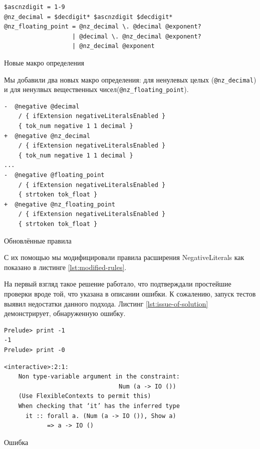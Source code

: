 \begin{ListingEnv}[H]
\begin{verbatim}
$ascnzdigit = 1-9
@nz_decimal = $decdigit* $ascnzdigit $decdigit*
@nz_floating_point = @nz_decimal \. @decimal @exponent?
                   | @decimal \. @nz_decimal @exponent?
                   | @nz_decimal @exponent
\end{verbatim}
\caption{Новые макро определения}
\end{ListingEnv}

Мы добавили два новых макро определения: для ненулевых целых
(\texttt{@nz\_decimal}) и для ненулвых вещественных
чисел(\texttt{@nz\_floating\_point}).

\begin{ListingEnv}[H]
\begin{verbatim}
-  @negative @decimal
    / { ifExtension negativeLiteralsEnabled }
    { tok_num negative 1 1 decimal }
+  @negative @nz_decimal
    / { ifExtension negativeLiteralsEnabled }
    { tok_num negative 1 1 decimal }
...
-  @negative @floating_point
    / { ifExtension negativeLiteralsEnabled }
    { strtoken tok_float }
+  @negative @nz_floating_point
    / { ifExtension negativeLiteralsEnabled }
    { strtoken tok_float }
\end{verbatim}
\caption{Обновлённые правила}
\label{lst:modified-rules}
\end{ListingEnv}

С их помощью мы модифицировали правила расширения NegativeLiterals как показано
в листинге \ref{lst:modified-rules}.

На первый взгляд такое решение работало, что подтверждали простейшие проверки
вроде той, что указана в описании ошибки. К сожалению, запуск тестов выявил
недостатки данного подхода. Листинг \ref{lst:issue-of-solution} демонстрирует,
обнаруженную ошибку.

\begin{ListingEnv}[H]
\begin{lstlisting}
Prelude> print -1
-1
Prelude> print -0
\end{lstlisting}
\begin{verbatim}
<interactive>:2:1:
    Non type-variable argument in the constraint:
                                Num (a -> IO ())
    (Use FlexibleContexts to permit this)
    When checking that ‘it’ has the inferred type
      it :: forall a. (Num (a -> IO ()), Show a)
            => a -> IO ()
\end{verbatim}
\caption{Ошибка}
\label{lst:issue-of-solution}
\end{ListingEnv}

